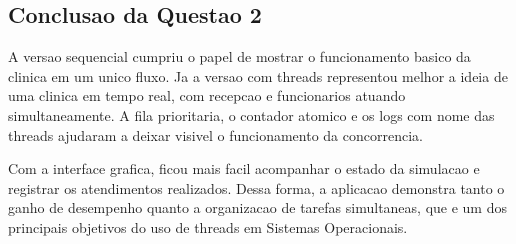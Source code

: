 \subsection{Conclusao da Questao 2}

A versao sequencial cumpriu o papel de mostrar o funcionamento basico da clinica em um unico fluxo. Ja a versao com threads representou melhor a ideia de uma clinica em tempo real, com recepcao e funcionarios atuando simultaneamente. A fila prioritaria, o contador atomico e os logs com nome das threads ajudaram a deixar visivel o funcionamento da concorrencia.

Com a interface grafica, ficou mais facil acompanhar o estado da simulacao e registrar os atendimentos realizados. Dessa forma, a aplicacao demonstra tanto o ganho de desempenho quanto a organizacao de tarefas simultaneas, que e um dos principais objetivos do uso de threads em Sistemas Operacionais.
